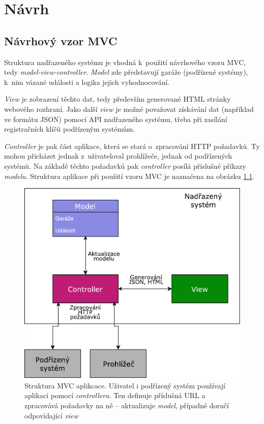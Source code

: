 \chapter{Návrh}
\label{sec:de}

\section{Návrhový vzor MVC}
\label{sec:de_mvc}

Struktura nadřazeného systému je vhodná k~použití návrhového vzoru MVC, tedy \textit{model-view-controller}. \textit{Model} zde představují garáže (podřízené systémy), k~nim vázané události a logika jejich vyhodnocování. 

\textit{View} je zobrazení těchto dat, tedy především generované HTML stránky webového rozhraní. Jako další \textit{view} je možné považovat získávání dat (například ve formátu JSON) pomocí API nadřazeného systému, třeba při zasílání registračních klíčů podřízeným systémům.

\textit{Controller} je pak část aplikace, která se stará o~zpracování HTTP požadavků. Ty mohou přicházet jednak z~uživateloval prohlížeče, jednak od podřízených systémů. Na základě těchto požadavků pak \textit{controller} posílá příslušné příkazy \textit{modelu}. Struktura aplikace při použití vzoru MVC je naznačena na obrázku \ref{fig:mvc}.

\begin{figure}[h!]
    \centering
    \includegraphics[width=\textwidth]{images/mvc.pdf}
    \caption[Struktura MVC aplikace]{Struktura MVC aplikcace. Uživatel i podřízený systém používají aplikaci pomocí \textit{controlleru}. Ten definuje příslušná URL a zpracovává požadavky na ně -- aktualizuje \textit{model}, případně doručí odpovídající \textit{view}}
    \label{fig:mvc}
\end{figure}

